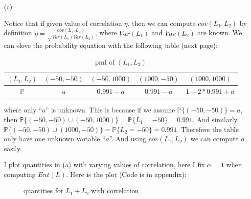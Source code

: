 \documentclass[letterpaper,11pt]{article}
\begin{document}
\begin{spacing}{1.2}
(c)

Notice that if given value of correlation $\eta$, then we can compute $cov(L_1,L_2)$ by definition $\eta = \frac{cov(L_1,L_2)}{\sqrt{Var(L_1)Var(L_2)}}$, where $Var(L_1)$ and $Var(L_2)$ are known. We can slove the probability equation with the following table (next page):


\begin{table}[h]
\centering
\caption{pmf of $(L_1,L_2)$}
\begin{tabular}{|c|c|c|c|c|}
\hline
$(L_1,L_2)$ & $(-50,-50)$ & $(-50,1000)$ & $(1000,-50)$ & $(1000,1000)$\\
\hline
$\mathbb{P}$ & $a$ & $0.991-a$ & $0.991-a$ & $1-2*0.991+a$\\
\hline
\end{tabular}
\end{table}

where only ``$a$'' is unknown. This is because if we assume $\mathbb{P}\{(-50,-50)\} = a$, then $\mathbb{P}\{(-50,-50) \cup (-50,1000)\} = \mathbb{P}\{L_1 = -50\} = 0.991$. And similarly, $\mathbb{P}\{(-50,-50) \cup (1000,-50)\} = \mathbb{P}\{L_2 = -50\} = 0.991$. Therefore the table only have one unknown variable ``$a$''. And using $cov(L_1,L_2)$ we can compute $a$ easily.

I plot quantities in (a) with varying values of correlation, here I fix $\alpha=1$ when computing $Ent(L)$. Here is the plot (Code is in appendix):

\begin{figure}[htbp]        
 \caption{\label{2} quantities for $L_1+L_2$ with correlation}      
 \end{figure}


\end{spacing}
\end{document}
